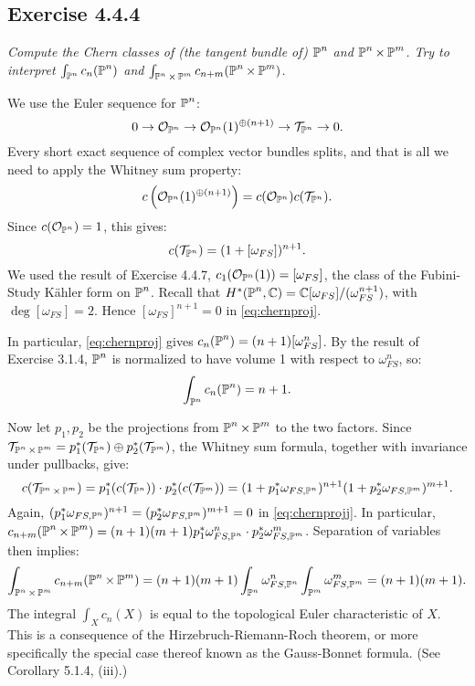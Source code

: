 \documentclass{article}
\begin{document}
\subsection*{Exercise 4.4.4}
\emph{Compute the Chern classes of (the tangent bundle of) $\operatorname{\mathbb{P}}^n$ and $\operatorname{\mathbb{P}}^n \times \operatorname{\mathbb{P}}^m$.
Try to interpret $\int_{\operatorname{\mathbb{P}}^n}c_n(\operatorname{\mathbb{P}}^n)$ and $\int_{\operatorname{\mathbb{P}}^n\times \operatorname{\mathbb{P}}^m}c_{n+m}(\operatorname{\mathbb{P}}^n\times \operatorname{\mathbb{P}}^m)$.}
\vspace{3mm}

We use the Euler sequence for $\operatorname{\mathbb{P}}^n$:
\[	0 \to \mathcal{O}_{\operatorname{\mathbb{P}}^n} \to \mathcal{O}_{\operatorname{\mathbb{P}}^n}(1)^{\oplus(n+1)} \to \mathcal{T}_{\operatorname{\mathbb{P}}^n} \to 0.	\]
Every short exact sequence of complex vector bundles splits, and that is all we need to apply the Whitney sum property:
\[	c\left(\mathcal{O}_{\operatorname{\mathbb{P}}^n}(1)^{\oplus(n+1)}\right) = c(\mathcal{O}_{\operatorname{\mathbb{P}}^n}) c(\mathcal{T}_{\operatorname{\mathbb{P}}^n}).	\]
Since $c(\mathcal{O}_{\operatorname{\mathbb{P}}^n}) = 1$, this gives:
\begin{equation}
\label{eq:chernproj}
c(\mathcal{T}_{\operatorname{\mathbb{P}}^n}) = (1+ [\omega_{FS}])^{n+1}.
\end{equation}
We used the result of Exercise 4.4.7, $c_1(\mathcal{O}_{\operatorname{\mathbb{P}}^n}(1)) = [\omega_{FS}]$, the class of the Fubini-Study
K\"{a}hler form on $\operatorname{\mathbb{P}}^n$. Recall that $H^*(\operatorname{\mathbb{P}}^n,\mathbb{C}) = \mathbb{C}[\omega_{FS}]/(\omega_{FS}^{n+1})$, with $\deg [\omega_{FS}]
= 2$. Hence $[\omega_{FS}]^{n+1} = 0$ in \ref{eq:chernproj}.

In particular, \ref{eq:chernproj} gives $c_n(\operatorname{\mathbb{P}}^n) = (n+1) [\omega_{FS}^n]$. By the result of Exercise 3.1.4,
$\operatorname{\mathbb{P}}^n$ is normalized to have volume 1 with respect to $\omega_{FS}^n$, so:
\[	\int_{\operatorname{\mathbb{P}}^n} c_n(\operatorname{\mathbb{P}}^n) = n+1.	\]

Now let $p_1, p_2$ be the projections from $\operatorname{\mathbb{P}}^n \times \operatorname{\mathbb{P}}^m$ to the two factors. Since $\mathcal{T}_{\operatorname{\mathbb{P}}^n \times
\operatorname{\mathbb{P}}^m} = p_1^*(\mathcal{T}_{\operatorname{\mathbb{P}}^n}) \oplus p_2^*(\mathcal{T}_{\operatorname{\mathbb{P}}^m})$, the Whitney sum formula, together with invariance
under pullbacks, give:
\begin{equation}
\label{eq:chernprojj}
c(\mathcal{T}_{\operatorname{\mathbb{P}}^n \times\operatorname{\mathbb{P}}^m}) = p_1^*(c(\mathcal{T}_{\operatorname{\mathbb{P}}^n})) \cdot p_2^*(c(\mathcal{T}_{\operatorname{\mathbb{P}}^m}))
= (1 + p_1^* \omega_{FS,\operatorname{\mathbb{P}}^n})^{n+1} (1 + p_2^* \omega_{FS,\operatorname{\mathbb{P}}^m})^{m+1}.
\end{equation}
Again, $(p_1^* \omega_{FS,\operatorname{\mathbb{P}}^n})^{n+1} = (p_2^* \omega_{FS,\operatorname{\mathbb{P}}^m})^{m+1} = 0$ in \ref{eq:chernprojj}. In particular,
$c_{n+m}(\operatorname{\mathbb{P}}^n\times\operatorname{\mathbb{P}}^m) = (n+1)(m+1) p_1^* \omega_{FS,\operatorname{\mathbb{P}}^n}^n \cdot p_2^* \omega_{FS,\operatorname{\mathbb{P}}^m}^m$. Separation of variables
then implies:
\[	\int_{\operatorname{\mathbb{P}}^n\times\operatorname{\mathbb{P}}^m} c_{n+m}(\operatorname{\mathbb{P}}^n\times\operatorname{\mathbb{P}}^m) =(n+1)(m+1) \int_{\operatorname{\mathbb{P}}^n} \omega_{FS,\operatorname{\mathbb{P}}^n}^n
\int_{\operatorname{\mathbb{P}}^m} \omega_{FS,\operatorname{\mathbb{P}}^m}^m = (n+1)(m+1). 	\]
The integral $\int_X c_n(X)$ is equal to the topological Euler characteristic of $X$. This is a consequence of the 
Hirzebruch-Riemann-Roch theorem, or more specifically the special case thereof known as the Gauss-Bonnet formula. 
(See Corollary 5.1.4, (iii).)
\end{document}
